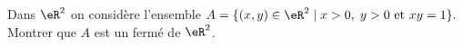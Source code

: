 \begin{exercice}[\minsyndical]\label{exoEspVectoNorme0006}

Dans $\eR ^2 $ on considère l'ensemble
$ A = \{ (x,y )\in \eR^2 \; | \; x> 0, \; y > 0 \mbox{ et } xy =1 \}. $
Montrer que $A$ est un fermé de $\eR^2$.

\end{exercice}
